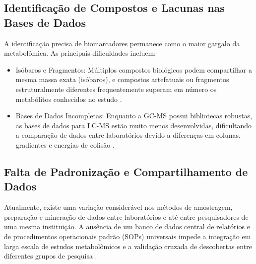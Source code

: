 \subsection{Identificação de Compostos e Lacunas nas Bases de Dados}

A identificação precisa de biomarcadores permanece como o maior gargalo da metabolômica. As principais dificuldades incluem:
\begin{itemize}
    \item Isóbaros e Fragmentos: Múltiplos compostos biológicos podem compartilhar a mesma massa exata (isóbaros), e compostos artefatuais ou fragmentos estruturalmente diferentes frequentemente superam em número os metabólitos conhecidos no estudo \cite{jong2018challenges}.
\end{itemize}

\begin{itemize}
    \item Bases de Dados Incompletas: Enquanto a GC-MS possui bibliotecas robustas, as bases de dados para LC-MS estão muito menos desenvolvidas, dificultando a comparação de dados entre laboratórios devido a diferenças em colunas, gradientes e energias de colisão \cite{johnson2012challenges}.
\end{itemize}

\subsection{Falta de Padronização e Compartilhamento de Dados }

Atualmente, existe uma variação considerável nos métodos de amostragem, preparação e mineração de dados entre laboratórios e até entre pesquisadores de uma mesma instituição. A ausência de um banco de dados central de relatórios e de procedimentos operacionais padrão (SOPs) universais impede a integração em larga escala de estudos metabolômicos e a validação cruzada de descobertas entre diferentes grupos de pesquisa \cite{johnson2012challenges}.